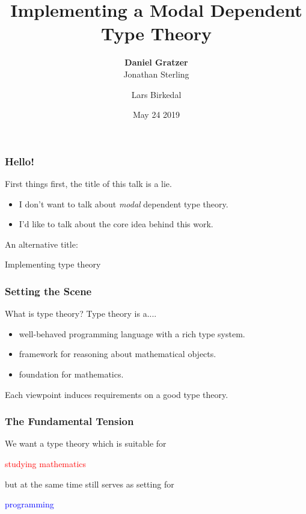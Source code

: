 \documentclass[usenames,dvipsnames,aspectratio=169,12pt]{beamer}
\title{Implementing a Modal Dependent Type Theory}
\author{\textbf{Daniel Gratzer}\inst{1}\\%
  Jonathan Sterling\inst{2} \and Lars Birkedal\inst{1}}
\institute{\inst{1} This University \smiley{} \\ \inst{2} Not This University \frownie{}}
\date{May 24 2019}
\begin{document}
\begin{frame}[noframenumbering]
  \titlepage
\end{frame}

\begin{frame}
  \frametitle{Hello!}
  First things first, the title of this talk is a lie.
  \pause

  \begin{itemize}
  \item I don't want to talk about \emph{modal} dependent type theory.
  \item I'd like to talk about the core idea behind this work.
  \end{itemize}
  \pause
  \bigskip

  An alternative title:
  \begin{center}
    \color{Blue}
    \Large
    Implementing type theory
  \end{center}

\end{frame}

\begin{frame}
  \frametitle{Setting the Scene}

  What is type theory? Type theory is a....
  \begin{itemize}
  \item well-behaved programming language with a rich type system.

  \item framework for reasoning about mathematical objects.

  \item foundation for mathematics.
  \end{itemize}
  \pause\pause\pause
  \bigskip


  Each viewpoint induces requirements on a good type theory.
\end{frame}

\begin{frame}
  \frametitle{The Fundamental Tension}

  We want a type theory which is suitable for

  \begin{center}
    \textcolor{Red}{studying mathematics}
  \end{center}

  but at the same time still serves as setting for

  \begin{center}
    \textcolor{Blue}{programming}
  \end{center}

\end{frame}
\end{document}
